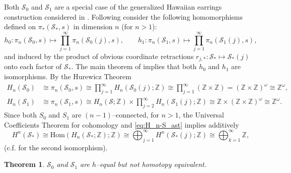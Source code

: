 \documentclass[reqno,12pt]{amsart}
\newtheorem{theorem}{Theorem}
\theoremstyle{ourremark}
\numberwithin{equation}{section}
\numberwithin{theorem}{section}
\begin{document}
Both $\mathcal{S}_0$ and $\mathcal{S}_1$ are a special case of the generalized Hawaiian earrings construction considered in \cite{Eda-Kawamura00}.  Following \cite{Eda-Kawamura00} consider the following homomorphisms defined on $\pi_\ast(\mathcal{S}_\ast,s)$ in dimension $n$ (for $n>1$): 
\[
 h_0:\pi_n(\mathcal{S}_0,s)\longmapsto \prod^\infty_{j=1} \pi_n(\mathcal{S}_0(j),s),\qquad h_1:\pi_n(\mathcal{S}_1,s)\longmapsto \prod^\infty_{j=1} \pi_n(\mathcal{S}_1(j),s),
\]
and induced by the product of obvious coordinate retractions $r_{j,\ast}:\mathcal{S}_\ast\longmapsto \mathcal{S}_\ast(j)$ onto each factor of $\mathcal{S}_\ast$. The main theorem of \cite[p. 18]{Eda-Kawamura00} implies that both $h_0$ and $h_1$ are isomorphisms. 
By the Hurewicz Theorem 
\begin{equation}\label{eq:H_n-S_ast}
\begin{split}
 H_n(\mathcal{S}_0) & \cong \pi_n(\mathcal{S}_0,s)\cong \prod^\infty_{j=1} H_n(\mathcal{S}_0(j);{\mathbb{Z}})\cong \prod^\infty_{j=1} ({\mathbb{Z}}\times {\mathbb{Z}})=({\mathbb{Z}}\times {\mathbb{Z}})^\omega\cong {\mathbb{Z}}^\omega,\\
 H_n(\mathcal{S}_1) & \cong \pi_n(\mathcal{S}_1,s)\cong H_n(\mathcal{S};{\mathbb{Z}})\times \prod^\infty_{j=2} H_n(\mathcal{S}_1(j);{\mathbb{Z}})\cong {\mathbb{Z}}\times ({\mathbb{Z}}\times {\mathbb{Z}})^\omega\cong {\mathbb{Z}}^\omega.
\end{split}
\end{equation}
{\noindent} Since both $S_0$ and $S_1$ are $(n-1)$--connected, for $n>1$, the Universal Coefficients Theorem for cohomology and \eqref{eq:H_n-S_ast} implies additively
\begin{equation}\label{eq:H^n-S_ast}
 H^n(\mathcal{S}_\ast)\cong \text{Hom}(H_n(\mathcal{S}_\ast;{\mathbb{Z}});{\mathbb{Z}})\cong \bigoplus^\infty_{j=1} H^n(\mathcal{S}_\ast(j);{\mathbb{Z}})\cong  \bigoplus^\infty_{k=1}{\mathbb{Z}},
\end{equation}
(c.f. \cite[p. 67]{Nunke62} for the second isomorphism). 
\begin{theorem}\label{thm:S_0-S_1}
$\mathcal{S}_0$ and $\mathcal{S}_1$ are $h$--equal but not homotopy equivalent.
\end{theorem} 
\end{document}
